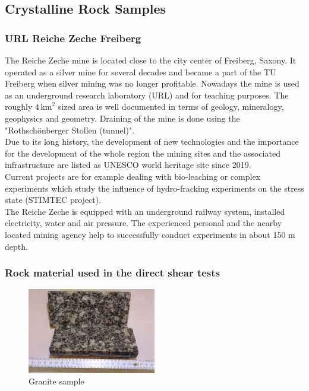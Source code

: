 \subsection{Crystalline Rock Samples}

\subsubsection{URL Reiche Zeche Freiberg}
The Reiche Zeche mine is located close to the city center of Freiberg, Saxony. It operated as a silver mine for several decades and became a part of the TU Freiberg when silver mining was no longer profitable. Nowadays the mine is used as an underground research laboratory (URL) and for teaching purposes. The roughly $4\,\text{km}^2$ sized area is well documented in terms of geology, mineralogy, geophysics and geometry. Draining of the mine is done using the "Rothsch\"onberger Stollen (tunnel)".\\
Due to its long history, the development of new technologies and the importance for the development of the whole region the mining sites and the associated infrastructure are listed as UNESCO world heritage site since 2019.\\
Current projects are for example dealing with bio-leaching or complex experiments which study the influence of hydro-fracking experiments on the stress state (STIMTEC project).\\
The Reiche Zeche is equipped with an underground railway system, installed electricity, water and air pressure. The experienced personal and the nearby located mining agency help to successfully conduct experiments in about 150 m depth. 




\subsubsection{Rock material used in the direct shear tests}
\begin{figure}[!ht]
\begin{center}
\includegraphics[width=0.5\textwidth]{./figures/ExpRockGranite.JPG}
\end{center}
\caption{Granite sample}
\label{fig:RockGranite}
\end{figure}


